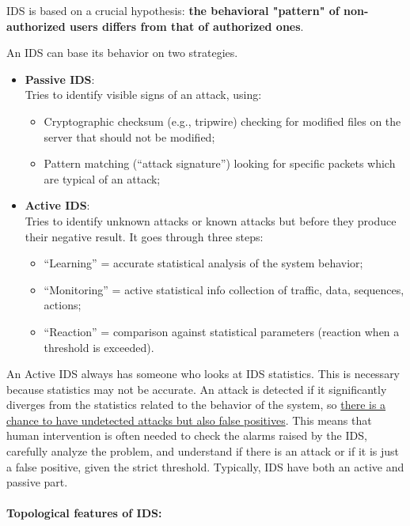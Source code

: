 IDS is based on a crucial hypothesis: \textbf{the behavioral "pattern" of non-authorized users differs from that of authorized ones}.

An IDS can base its behavior on two strategies.

\begin{itemize}
    \item \textbf{Passive IDS}:\\
          Tries to identify visible signs of an attack, using:
          \begin{itemize}
              \item Cryptographic checksum (e.g., tripwire) checking for modified files on the server that should not be modified;
              \item Pattern matching (“attack signature”) looking for specific packets which are typical of an attack;
          \end{itemize}

    \item \textbf{Active IDS}:\\
          Tries to identify unknown attacks or known attacks but before they produce their negative result. It goes through three steps:
          \begin{itemize}
              \item “Learning” = accurate statistical analysis of the system behavior;
              \item “Monitoring” = active statistical info collection of traffic, data, sequences, actions;
              \item “Reaction” = comparison against statistical parameters (reaction when a threshold is exceeded).
          \end{itemize}
\end{itemize}

An Active IDS always has someone who looks at IDS statistics. This is necessary because statistics may not be accurate. An attack is detected if it significantly diverges from the statistics related to the behavior of the system, so \ul{there is a chance to have undetected attacks but also false positives}. This means that human intervention is often needed to check the alarms raised by the IDS, carefully analyze the problem, and understand if there is an attack or if it is just a false positive, given the strict threshold. Typically, IDS have both an active and passive part.

\paragraph{Topological features of IDS:}

